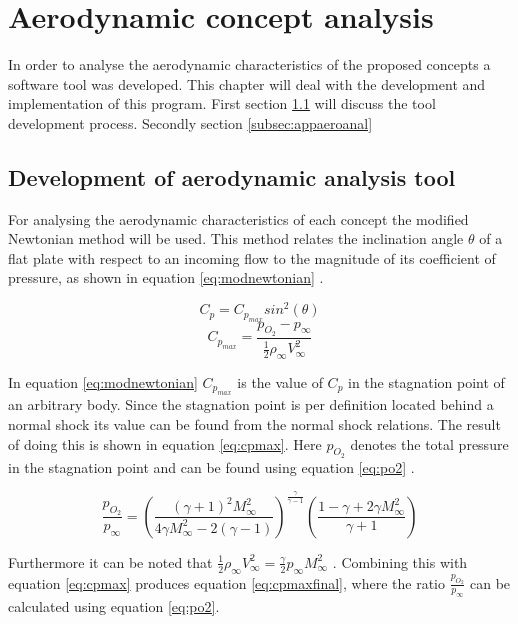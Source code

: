 \section{Aerodynamic concept analysis}
\label{ch:aero_analysis}
In order to analyse the aerodynamic characteristics of the proposed concepts a software tool was developed. This chapter will deal with the development and implementation of this program. First section \ref{subsec:aerotool} will discuss the tool development process. Secondly section \ref{subsec:appaeroanal} 

\subsection{Development of aerodynamic analysis tool}
\label{subsec:aerotool}
For analysing the aerodynamic characteristics of each concept the modified Newtonian method will be used. This method relates the inclination angle $\theta$ of a flat plate with respect to an incoming flow to the magnitude of its coefficient of pressure, as shown in equation \ref{eq:modnewtonian} \cite{AndersonJr.2006}.
\begin{multicols}{2}
\begin{equation}
C_{p}=C_{p_{max}}sin^{2}(\theta)
\label{eq:modnewtonian}
\end{equation} \break
\begin{equation}
C_{p_{max}}=\frac{p_{O_{2}}-p_{\infty}}{\frac{1}{2}\rho_{\infty}V_{\infty}^{2}}
\label{eq:cpmax}
\end{equation}
\end{multicols}
In equation \ref{eq:modnewtonian} $C_{p_{max}}$ is the value of $C_{p}$ in the stagnation point of an arbitrary body. Since the stagnation point is per definition located behind a normal shock its value can be found from the normal shock relations. The result of doing this is shown in equation \ref{eq:cpmax}. Here $p_{O_{2}}$ denotes the total pressure in the stagnation point and can be found using equation \ref{eq:po2} \cite{AndersonJr.2007}.

\begin{equation}
\frac{p_{O_{2}}}{p_{\infty}}=\left(\frac{(\gamma+1)^{2}M_{\infty}^{2}}{4\gamma M_{\infty}^{2}-2(\gamma-1)}\right)^{\frac{\gamma}{\gamma-1}}\left(\frac{1-\gamma+2\gamma M_{\infty}^{2}}{\gamma+1}\right)
\label{eq:po2}
\end{equation}

Furthermore it can be noted that $\frac{1}{2}\rho_{\infty}V_{\infty}^{2}=\frac{\gamma}{2}p_{\infty}M_{\infty}^{2}$ \cite{AndersonJr.2007}. Combining this with equation \ref{eq:cpmax} produces equation \ref{eq:cpmaxfinal}, where the ratio $\frac{p_{O_{2}}}{p_{\infty}}$ can be calculated using equation \ref{eq:po2}.

